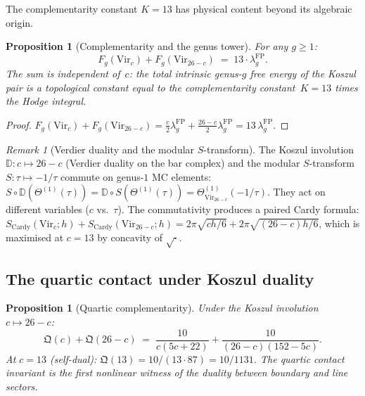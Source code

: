 \documentclass[11pt,reqno]{amsart}
\newtheorem{proposition}[theorem]{Proposition}
\theoremstyle{definition}
\theoremstyle{remark}
\newtheorem{remark}[theorem]{Remark}
\begin{document}
The complementarity constant $K = 13$ has physical content beyond its
algebraic origin.

\begin{proposition}[Complementarity and the genus tower]
\label{prop:complementarity-genus}
For any\/ $g \ge 1$:
\begin{equation}\label{eq:complementarity-genus}
F_g(\mathrm{Vir}_c) + F_g(\mathrm{Vir}_{26-c})
\;=\;
13 \cdot \lambda_g^{\mathrm{FP}}.
\end{equation}
The sum is independent of~$c$: the total intrinsic genus-$g$ free
energy of the Koszul pair is a topological constant equal to the
complementarity constant~$K = 13$ times the Hodge integral.
\end{proposition}

\begin{proof}
$F_g(\mathrm{Vir}_c) + F_g(\mathrm{Vir}_{26-c})
= \frac{c}{2}\lambda_g^{\mathrm{FP}}
+ \frac{26-c}{2}\lambda_g^{\mathrm{FP}}
= 13\,\lambda_g^{\mathrm{FP}}$.
\end{proof}

\begin{remark}[Verdier duality and the modular $S$-transform]
\label{rem:verdier-s-commute}
The Koszul involution $\mathbb{D}\colon c \mapsto 26-c$ (Verdier
duality on the bar complex) and the modular $S$-transform
$S\colon \tau \mapsto -1/\tau$ commute on genus-$1$ MC elements:
$S \circ \mathbb{D}(\Theta^{(1)}(\tau))
= \mathbb{D} \circ S(\Theta^{(1)}(\tau))
= \Theta_{\mathrm{Vir}_{26-c}}^{(1)}(-1/\tau)$.
They act on different variables ($c$ vs.\ $\tau$). The commutativity
produces a paired Cardy formula:
$S_{\mathrm{Cardy}}(\mathrm{Vir}_c; h)
+ S_{\mathrm{Cardy}}(\mathrm{Vir}_{26-c}; h)
= 2\pi\sqrt{ch/6} + 2\pi\sqrt{(26-c)h/6}$,
which is maximised at $c = 13$ by concavity of $\sqrt{\cdot}$.
\end{remark}

\subsection{The quartic contact under Koszul duality}

\begin{proposition}[Quartic complementarity]
\label{prop:quartic-complementarity}
Under the Koszul involution $c \mapsto 26-c$:
\begin{equation}\label{eq:quartic-complementarity}
\mathfrak{Q}(c) + \mathfrak{Q}(26-c)
\;=\;
\frac{10}{c(5c+22)} + \frac{10}{(26-c)(152-5c)}.
\end{equation}
At $c = 13$ (self-dual):
$\mathfrak{Q}(13) = 10/(13 \cdot 87) = 10/1131$.
The quartic contact invariant is the first nonlinear witness of the
duality between boundary and line sectors.
\end{proposition}
\end{document}
